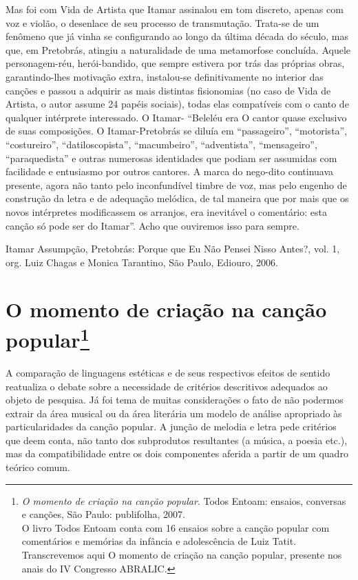 Mas foi com Vida de Artista que Itamar assinalou em tom discreto, apenas
com voz e violão, o desenlace de seu processo de transmutação. Trata-se
de um fenômeno que já vinha se configurando ao longo da última década do
século, mas que, em Pretobrás, atingiu a naturalidade de uma metamorfose
concluída. Aquele personagem-réu, herói-bandido, que sempre estivera por
trás das próprias obras, garantindo-lhes motivação extra, instalou-se
definitivamente no interior das canções e passou a adquirir as mais
distintas fisionomias (no caso de Vida de Artista, o autor assume 24
papéis sociais), todas elas compatíveis com o canto de qualquer
intérprete interessado. O Itamar- ``Beleléu era O cantor quase exclusivo
de suas composições. O Itamar-Pretobrás se diluía em ``passageiro'',
``motorista'', ``costureiro'', ``datiloscopista'', ``macumbeiro'',
``adventista'', ``mensageiro'', ``paraquedista'' e outras numerosas
identidades que podiam ser assumidas com facilidade e entusiasmo por
outros cantores. A marca do nego-dito continuava presente, agora não
tanto pelo inconfundível timbre de voz, mas pelo engenho de construção
da letra e de adequação melódica, de tal maneira que por mais que os
novos intérpretes modificassem os arranjos, era inevitável o comentário:
esta canção só pode ser do Itamar''. Acho que ouviremos isso para
sempre.

Itamar Assumpção, Pretobrás: Porque que Eu Não Pensei Nisso Antes?, vol.
1, org. Luiz Chagas e Monica Tarantino, São Paulo, Ediouro, 2006.

\chapter{O momento de criação na canção popular\footnote{\emph{O momento de criação na canção popular}. Todos Entoam: ensaios,
conversas e canções, São Paulo: publifolha, 2007.\\
O livro Todos Entoam conta com 16 ensaios sobre a canção
popular com comentários e memórias da infância e adolescência de Luiz
Tatit. Transcrevemos aqui O momento de criação na canção popular,
presente nos anais do IV Congresso ABRALIC.}}



A comparação de linguagens estéticas e de seus respectivos efeitos de
sentido reatualiza o debate sobre a necessidade de critérios descritivos
adequados ao objeto de pesquisa. Já foi tema de muitas considerações o
fato de não podermos extrair da área musical ou da área literária um
modelo de análise apropriado às particularidades da canção popular. A
junção de melodia e letra pede critérios que deem conta, não tanto dos
subprodutos resultantes (a música, a poesia etc.), mas da
compatibilidade entre os dois componentes aferida a partir de um quadro
teórico comum.

